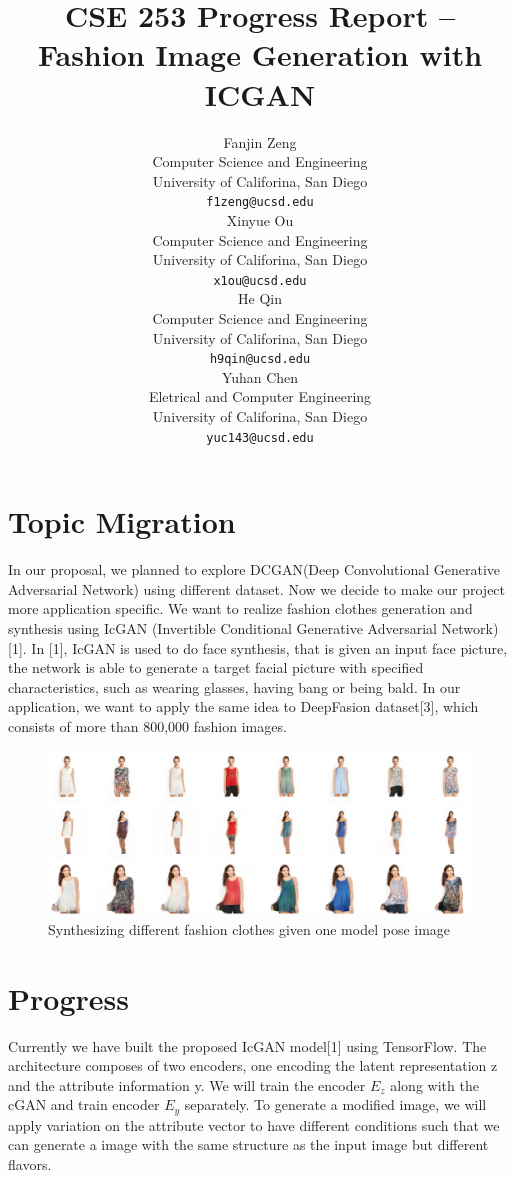 \documentclass{article}
\title{CSE 253 Progress Report -- Fashion Image Generation with ICGAN  }
\author{
  Fanjin Zeng \\
  Computer Science and Engineering\\
  University of Califorina, San Diego\\
  \texttt{f1zeng@ucsd.edu} \\
   \And
   Xinyue Ou \\
   Computer Science and Engineering\\
   University of Califorina, San Diego \\
   \texttt{x1ou@ucsd.edu} \\
   \And
   He Qin \\
   Computer Science and Engineering\\
   University of Califorina, San Diego \\
   \texttt{h9qin@ucsd.edu} \\
   \And
   Yuhan Chen \\
   Eletrical and Computer Engineering\\
   University of Califorina, San Diego \\
   \texttt{yuc143@ucsd.edu} \\
}
\begin{document}
\maketitle
\section{Topic Migration}
In our proposal, we planned to explore DCGAN(Deep Convolutional Generative Adversarial Network) using different dataset. Now we decide to make our project more application specific. We want to realize fashion clothes generation and synthesis using IcGAN (Invertible Conditional Generative Adversarial Network) [1]. In [1], IcGAN is used to do face synthesis, that is given an input face picture, the network is able to generate a target facial picture with specified characteristics, such as wearing glasses, having bang or being bald. In our application, we want to apply the same idea to DeepFasion dataset[3], which consists of more than 800,000 fashion images. 

\begin{figure}[h]
\centering
\includegraphics[width=1\linewidth]{pics/clothes.png}
\caption{Synthesizing different fashion clothes given one model pose image}
\label{fig:clothes}
\end{figure}





\section{Progress}
Currently we have built the proposed IcGAN model[1] using TensorFlow. The architecture composes of two encoders, one encoding the latent representation z and the attribute information y. We will train the encoder $E_z$ along with the cGAN and train encoder $E_y$ separately. To generate a modified image, we will apply variation on the attribute vector to have different conditions such that we can generate a image with the same structure as the input image but different flavors.
\end{document}

